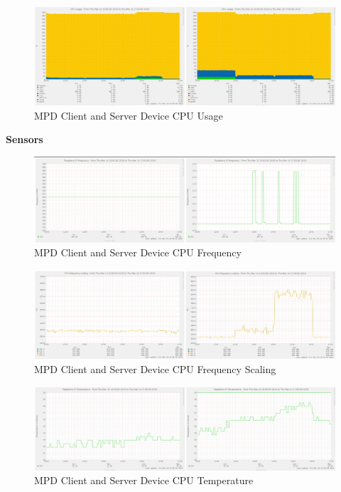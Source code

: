 \documentclass[11pt,a4paper,headinclude=false,footinclude=false]{scrreprt}
\begin{document}
\begin{figure}[H]
\includegraphics{ResultsAndAnalysis/MPDServerTestImages/004MPDCPUUsage.png}
\centering
\caption{MPD Client and Server Device CPU Usage}
\label{MPDCPUUsage}
\end{figure}

\textbf{Sensors}

\begin{figure}[H]
\includegraphics{ResultsAndAnalysis/MPDServerTestImages/001MPDCPUFreq.png}
\centering
\caption{MPD Client and Server Device CPU Frequency}
\label{MPDCPUFreq}
\end{figure}

\begin{figure}[H]
\includegraphics{ResultsAndAnalysis/MPDServerTestImages/002MPDCPUFreqScaling.png}
\centering
\caption{MPD Client and Server Device CPU Frequency Scaling}
\label{MPDCPUFreqScaling}
\end{figure}

\begin{figure}[H]
\includegraphics{ResultsAndAnalysis/MPDServerTestImages/003MPDCPUTemp.png}
\centering
\caption{MPD Client and Server Device CPU Temperature}
\label{MPDCPUTemp}
\end{figure}
\end{document}
